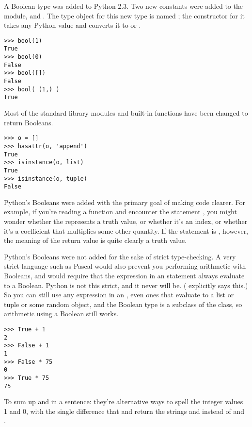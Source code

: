 \documentclass{howto}
\begin{document}
A Boolean type was added to Python 2.3.  Two new constants were added
to the  module,  and
.  The type object for this new type is named
; the constructor for it takes any Python value and
converts it to  or .

\begin{verbatim}
>>> bool(1)
True
>>> bool(0)
False
>>> bool([])
False
>>> bool( (1,) )
True
\end{verbatim}

Most of the standard library modules and built-in functions have been
changed to return Booleans.

\begin{verbatim}
>>> o = []
>>> hasattr(o, 'append')
True
>>> isinstance(o, list)
True
>>> isinstance(o, tuple)
False
\end{verbatim}

Python's Booleans were added with the primary goal of making code
clearer.  For example, if you're reading a function and encounter the
statement , you might wonder whether the 
represents a truth value, or whether it's an index, or whether it's a
coefficient that multiplies some other quantity.  If the statement is
, however, the meaning of the return value is quite
clearly a truth value.

Python's Booleans were not added for the sake of strict type-checking.
A very strict language such as Pascal
would also prevent you performing arithmetic with Booleans, and would
require that the expression in an  statement always
evaluate to a Boolean.  Python is not this strict, and it never will
be.  ( explicitly says this.)  So you can still use any
expression in an , even ones that evaluate to a list or
tuple or some random object, and the Boolean type is a subclass of the
 class, so arithmetic using a Boolean still works.

\begin{verbatim}
>>> True + 1
2
>>> False + 1
1
>>> False * 75
0
>>> True * 75
75
\end{verbatim}

To sum up  and  in a sentence: they're
alternative ways to spell the integer values 1 and 0, with the single
difference that  and  return the
strings  and  instead of  and .
\end{document}
